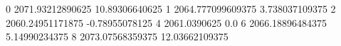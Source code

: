 0 2071.93212890625 10.89306640625
1 2064.777099609375 3.738037109375
2 2060.24951171875 -0.78955078125
4 2061.0390625 0.0
6 2066.18896484375 5.14990234375
8 2073.07568359375 12.03662109375
